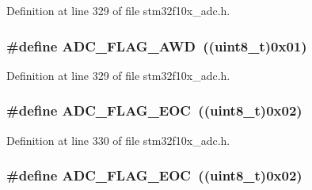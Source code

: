 Definition at line 329 of file stm32f10x\+\_\+adc.\+h.

\subsubsection[{\texorpdfstring{A\+D\+C\+\_\+\+F\+L\+A\+G\+\_\+\+A\+WD}{ADC_FLAG_AWD}}]{\setlength{\rightskip}{0pt plus 5cm}\#define A\+D\+C\+\_\+\+F\+L\+A\+G\+\_\+\+A\+WD~(({\bf uint8\+\_\+t})0x01)}\hypertarget{group___a_d_c__flags__definition_gadb75a4b430fb84950232b7a8f3a6a877}{}\label{group___a_d_c__flags__definition_gadb75a4b430fb84950232b7a8f3a6a877}


Definition at line 329 of file stm32f10x\+\_\+adc.\+h.

\subsubsection[{\texorpdfstring{A\+D\+C\+\_\+\+F\+L\+A\+G\+\_\+\+E\+OC}{ADC_FLAG_EOC}}]{\setlength{\rightskip}{0pt plus 5cm}\#define A\+D\+C\+\_\+\+F\+L\+A\+G\+\_\+\+E\+OC~(({\bf uint8\+\_\+t})0x02)}\hypertarget{group___a_d_c__flags__definition_gaf2c6fdf7e9ab63b778149e5fb56413d4}{}\label{group___a_d_c__flags__definition_gaf2c6fdf7e9ab63b778149e5fb56413d4}


Definition at line 330 of file stm32f10x\+\_\+adc.\+h.

\subsubsection[{\texorpdfstring{A\+D\+C\+\_\+\+F\+L\+A\+G\+\_\+\+E\+OC}{ADC_FLAG_EOC}}]{\setlength{\rightskip}{0pt plus 5cm}\#define A\+D\+C\+\_\+\+F\+L\+A\+G\+\_\+\+E\+OC~(({\bf uint8\+\_\+t})0x02)}\hypertarget{group___a_d_c__flags__definition_gaf2c6fdf7e9ab63b778149e5fb56413d4}{}\label{group___a_d_c__flags__definition_gaf2c6fdf7e9ab63b778149e5fb56413d4}


